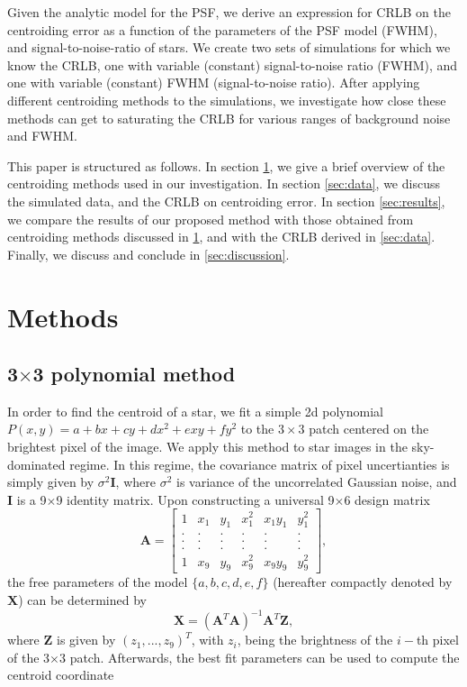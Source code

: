 \documentclass[12pt, preprint]{aastex}
\newcommand{\beq}{\begin{equation}}
\newcommand{\eeq}{\end{equation}}
\begin{document}
Given the analytic model for the PSF,
we derive an expression for CRLB on the centroiding error as
a function of the parameters of the PSF model (\eg FWHM),
and signal-to-noise-ratio of stars. We create two sets of simulations for which we 
know the CRLB, one with variable (constant) signal-to-noise ratio (FWHM), and one 
with variable (constant) FWHM (signal-to-noise ratio). After applying
different centroiding methods to the simulations,
we investigate how close these methods can get to saturating the CRLB for
various ranges of background noise and FWHM.

This paper is structured as follows. In section \ref{sec:method},
we give a brief overview of the centroiding methods used in our investigation.
In section \ref{sec:data}, we discuss the simulated data, and the CRLB on centroiding error.
In section \ref{sec:results}, we compare the results of our proposed method with 
those obtained from centroiding methods discussed in \ref{sec:method}, and 
with the CRLB derived in \ref{sec:data}. Finally, we discuss and conclude
in \ref{sec:discussion}.               

\section{Methods}\label{sec:method}

\subsection{3$\times$3 polynomial method}

In order to find the centroid of a star, 
we fit a simple 2d polynomial $P(x,y)=a+bx+cy+dx^2+exy+fy^2$ to the
$3\times3$ patch centered on the brightest pixel of the
image. We apply this method to star images in the sky-dominated regime.
In this regime, the covariance matrix of pixel uncertianties is simply
given by $\sigma^{2}\mathbf{I}$, where $\sigma^{2}$ is variance of the
uncorrelated Gaussian noise, and $\mathbf{I}$ is a 9$\times$9 identity matrix.
Upon constructing a universal 9$\times$6 design matrix
\begin{equation}
    \mathbf{A} = 
    \begin{bmatrix}
        1 & x_{1} & y_{1} & x_{1}^{2} & x_{1}y_{1} & y_{1}^{2} \\
        . & . & . & . & . & .  \\
        . & . & . & . & . & .  \\
        . & . & . & . & . & .  \\
        1 & x_{9} & y_{9} & x_{9}^{2} & x_{9}y_{9} & y_{9}^{2}
    \end{bmatrix},
\end{equation}
the free parameters of the model $\{a,b,c,d,e,f\}$
(hereafter compactly denoted by $\mathbf{X}$) can be determined by 
\beq
\mathbf{X} = (\mathbf{A}^{T}\mathbf{A})^{-1}\mathbf{A}^{T}\mathbf{Z},
\label{linearfit}
\eeq
where $\mathbf{Z}$ is given by $(z_{1},...,z_{9})^{T}$,
with $z_{i}$, being the brightness of the $i-$th pixel of the 3$\times$3 patch.
Afterwards, the best fit parameters can be used to compute the centroid coordinate
\end{document}
